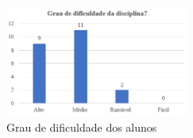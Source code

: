 \begin{figure}[htb]	
\center%
\includegraphics[width=6cm]{./img/grau_dificuldade.png}

\caption{Grau de dificuldade dos alunos}

\end{figure}